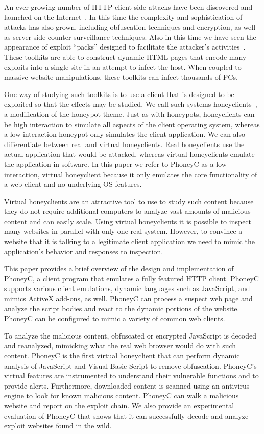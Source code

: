 \documentclass[10pt,twocolumn]{article}
\begin{document}
An ever growing number of HTTP client-side attacks have been discovered and launched on the Internet~\cite{servers:kye}. In this time the complexity and sophistication of attacks has also grown, including obfuscation techniques and encryption, as well as server-side counter-surveillance techniques. Also in this time we have seen the appearance of exploit ``packs'' designed to facilitate the attacker's activities~\cite{provos:ayi}. These toolkits are able to construct dynamic HTML pages that encode many exploits into a single site in an attempt to infect the host. When coupled to massive website manipulations, these toolkits can infect thousands of PCs. 

One way of studying such toolkits is to use a client that is designed to be exploited so that the effects may be studied. We call such systems honeyclients~\cite{wang2005uhd}, a modification of the honeypot theme. Just as with honeypots, honeyclients can be high interaction to simulate all aspects of the client operating system, whereas a low-interaction honeypot only simulates the client application. We can also differentiate between real and virtual honeyclients. Real honeyclients use the actual application that would be attacked, whereas virtual honeyclients emulate the application in software. In this paper we refer to PhoneyC as a low interaction, virtual honeyclient because it only emulates the core functionality of a web client and no underlying OS features.

Virtual honeyclients are an attractive tool to use to study such content because they do not require additional computers to analyze vast amounts of malicious content and can easily scale. Using virtual honeyclients it is possible to inspect many websites in parallel with only one real system. However, to convince a website that it is talking to a legitimate client application we need to mimic the application's behavior and responses to inspection. 

This paper provides a brief overview of the design and implementation of PhoneyC, a client program that emulates a fully featured HTTP client. PhoneyC supports various client emulations, dynamic languages such as JavaScript, and mimics ActiveX add-ons, as well. PhoneyC can process a suspect web page and analyze the script bodies and react to the dynamic portions of the website. PhoneyC can be configured to mimic a variety of common web clients. 

To analyze the malicious content, obfuscated or encrypted JavaScript is decoded and reanalyzed, mimicking what the real web browser would do with such content. PhoneyC is the first virtual honeyclient that can perform dynamic analysis of JavaScript and Visual Basic Script to remove obfuscation. PhoneyC's virtual features are instrumented to understand their vulnerable functions and to provide alerts. Furthermore, downloaded content is scanned using an antivirus engine to look for known malicious content. PhoneyC can walk a malicious website and report on the exploit chain. We also provide an experimental evaluation of PhoneyC that shows that it can successfully decode and analyze exploit websites found in the wild. 
\end{document}
